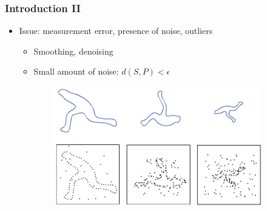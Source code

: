 \documentclass{beamer}
\begin{document}
\begin{frame}
    \frametitle{Introduction II}


    \begin{itemize}
        \item Issue: measurement error, presence of noise, outliers
        \begin{itemize}
            \item Smoothing, denoising
            \item Small amount of noise: $ d(S, P) < \epsilon $
        \end{itemize}
    \end{itemize}

    \begin{figure}
        \centering
        \begin{subfigure}{.5\textwidth}
            \centering
            \includegraphics[scale=0.3]{img/noise-2d}
        \end{subfigure}
    \end{figure}
\end{frame}
\end{document}

